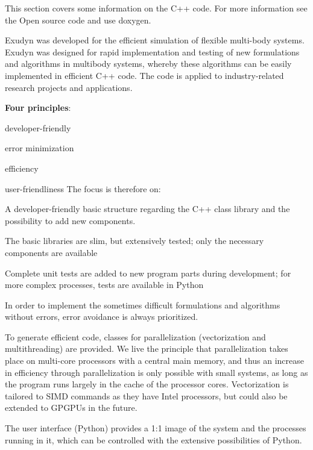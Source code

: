 
This section covers some information on the C++ code. For more information see the Open source code and use doxygen.

Exudyn was developed for the efficient simulation of flexible multi-body systems. Exudyn was designed for rapid implementation and testing of new formulations and algorithms in multibody systems, whereby these algorithms can be easily implemented in efficient C++ code. The code is applied to industry-related research projects and applications.

{\bf Four principles}: 
\bn
  \item developer-friendly
	\item error minimization
	\item efficiency
	\item user-friendliness
\en
The focus is therefore on:
\bi
    \item A developer-friendly basic structure regarding the C++ class library and the possibility to add new components.
    \item The basic libraries are slim, but extensively tested; only the necessary components are available
    \item Complete unit tests are added to new program parts during development; for more complex processes, tests are available in Python
    \item In order to implement the sometimes difficult formulations and algorithms without errors, error avoidance is always prioritized.
    \item To generate efficient code, classes for parallelization (vectorization and multithreading) are provided. We live the principle that parallelization takes place on multi-core processors with a central main memory, and thus an increase in efficiency through parallelization is only possible with small systems, as long as the program runs largely in the cache of the processor cores. Vectorization is tailored to SIMD commands as they have Intel processors, but could also be extended to GPGPUs in the future.
    \item The user interface (Python) provides a 1:1 image of the system and the processes running in it, which can be controlled with the extensive possibilities of Python.
\ei

